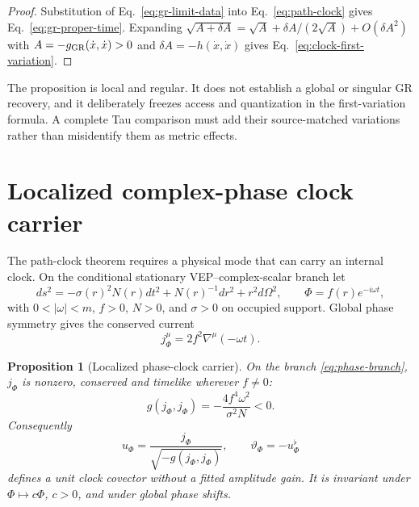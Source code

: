 \documentclass[11pt]{article}
\newtheorem{proposition}{Proposition}
\begin{document}
\begin{proof}
Substitution of Eq.~\eqref{eq:gr-limit-data} into
Eq.~\eqref{eq:path-clock} gives Eq.~\eqref{eq:gr-proper-time}. Expanding
\(\sqrt{A+\delta A}=\sqrt A+\delta A/(2\sqrt A)+O(\delta A^2)\) with
\(A=-g_{\rm GR}(\dot x,\dot x)>0\) and
\(\delta A=-h(\dot x,\dot x)\) gives
Eq.~\eqref{eq:clock-first-variation}.
\end{proof}

The proposition is local and regular. It does not establish a global or
singular GR recovery, and it deliberately freezes access and quantization in
the first-variation formula. A complete Tau comparison must add their
source-matched variations rather than misidentify them as metric effects.

\section{Localized complex-phase clock carrier}

The path-clock theorem requires a physical mode that can carry an internal
clock. On the conditional stationary VEP--complex-scalar branch let
\begin{equation}
 ds^2=-\sigma(r)^2N(r)dt^2+N(r)^{-1}dr^2+r^2d\Omega^2,
 \qquad
 \Phi=f(r)e^{-i\omega t},
 \label{eq:phase-branch}
\end{equation}
with \(0<|\omega|<m\), \(f>0\), \(N>0\), and \(\sigma>0\) on occupied
support. Global phase symmetry gives the conserved current
\begin{equation}
 j_\Phi^\mu=2f^2\nabla^\mu(-\omega t).
 \label{eq:phase-current}
\end{equation}

\begin{proposition}[Localized phase-clock carrier]
On the branch \eqref{eq:phase-branch}, \(j_\Phi\) is nonzero, conserved and
timelike wherever \(f\ne0\):
\begin{equation}
 g(j_\Phi,j_\Phi)
 =-\frac{4f^4\omega^2}{\sigma^2N}<0.
 \label{eq:timelike-current}
\end{equation}
Consequently
\begin{equation}
 u_\Phi=\frac{j_\Phi}{\sqrt{-g(j_\Phi,j_\Phi)}},
 \qquad
 \vartheta_\Phi=-u_\Phi^\flat
 \label{eq:unit-clock-covector}
\end{equation}
defines a unit clock covector without a fitted amplitude gain. It is invariant
under \(\Phi\mapsto c\Phi\), \(c>0\), and under global phase shifts.
\end{proposition}
\end{document}
